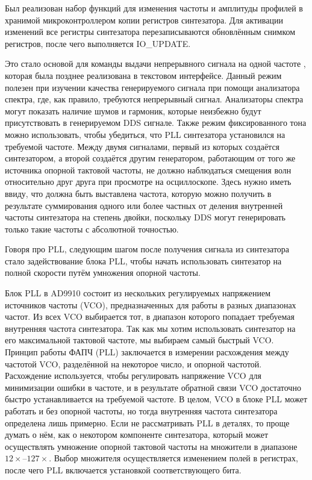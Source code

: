\documentclass[rusmathsym, eqnumwithinsec, amspack, hyperref]{bomgost}
\begin{document}
Был реализован набор функций для изменения частоты и амплитуды профилей в хранимой микроконтроллером копии регистров синтезатора. Для активации изменений все регистры синтезатора перезаписываются обновлённым снимком регистров, после чего выполняется IO\_UPDATE.

Это стало основой для команды выдачи непрерывного сигнала на одной частоте {\footnotesize{}}, которая была позднее реализована в текстовом интерфейсе. Данный режим полезен при изучении качества генерируемого сигнала при помощи анализатора спектра, где, как правило, требуются непрерывный сигнал. Анализаторы спектра могут показать наличие шумов и гармоник, которые неизбежно будут присутствовать в генерируемом DDS сигнале. Также режим фиксированного тона можно использовать, чтобы убедиться, что PLL синтезатора установился на требуемой частоте. Между двумя сигналами, первый из которых создаётся синтезатором, а второй создаётся другим генератором, работающим от того же источника опорной тактовой частоты, не должно наблюдаться смещения волн относительно друг друга при просмотре на осциллоскопе. Здесь нужно иметь ввиду, что должна быть выставлена частота, которую можно получить в результате суммирования одного или более частных от деления внутренней частоты синтезатора на степень двойки, поскольку DDS могут генерировать только такие частоты с абсолютной точностью.

Говоря про PLL, следующим шагом после получения сигнала из синтезатора стало задействование блока PLL, чтобы начать использовать синтезатор на полной скорости путём умножения опорной частоты.

Блок PLL в AD9910 состоит из нескольких регулируемых напряжением источников частоты (VCO), предназначенных для работы в разных диапазонах частот. Из всех VCO выбирается тот, в диапазон которого попадает требуемая внутренняя частота синтезатора. Так как мы хотим использовать синтезатор на его максимальной тактовой частоте, мы выбираем самый быстрый VCO. Принцип работы ФАПЧ (PLL) заключается в измерении расхождения между частотой VCO, разделённой на некоторое число, и опорной частотой. Расхождение используется, чтобы регулировать напряжение VCO для минимизации ошибки в частоте, и в результате обратной связи VCO достаточно быстро устанавливается на требуемой частоте. В целом, VCO в блоке PLL может работать и без опорной частоты, но тогда внутренняя частота синтезатора определена лишь примерно. Если не рассматривать PLL в деталях, то проще думать о нём, как о некотором компоненте синтезатора, который может осуществлять умножение опорной тактовой частоты на множители в диапазоне $12\times$--$127\times$. Выбор множителя осуществляется изменением полей в регистрах, после чего PLL включается установкой соответствующего бита.
\end{document}
